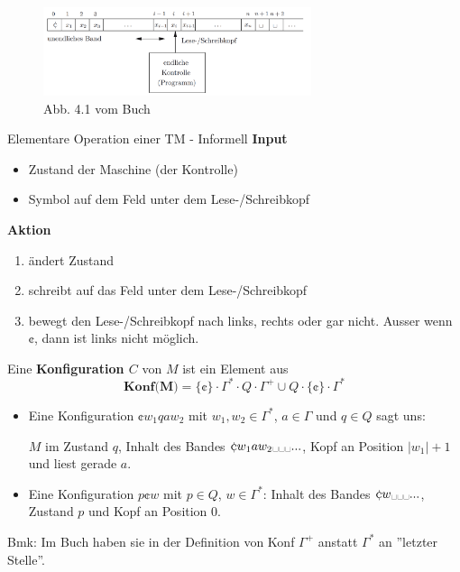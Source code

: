 \documentclass[a4paper, 11pt]{article}
\begin{document}
        \begin{figure}[htp]
            \centering
            \includegraphics[width=0.7\textwidth]{Images/Turingmaschine.png}
            \caption{Abb. 4.1 vom Buch}
        \end{figure}
    
        \begin{mainbox}{Elementare Operation einer TM - Informell}
            \textbf{Input}
            \begin{itemize}[label = -]
                \item Zustand der Maschine (der Kontrolle)
                \item Symbol auf dem Feld unter dem Lese-/Schreibkopf
            \end{itemize}
            \textbf{Aktion}
            \begin{enumerate}[label=(\roman*)]
                \item ändert Zustand
                \item schreibt auf das Feld unter dem Lese-/Schreibkopf
                \item bewegt den Lese-/Schreibkopf nach links, rechts oder gar nicht. Ausser wenn $\cent$, dann ist links nicht möglich.
            \end{enumerate}
        \end{mainbox}
    
        \begin{mainbox}{}
            Eine \textbf{Konfiguration $C$} von $M$ ist ein Element aus 
            $$\textbf{Konf($\mathbf{M}$)} =  \{\cent\} \cdot \Gamma^* \cdot Q \cdot \Gamma^+ \cup Q \cdot \{\cent\} \cdot \Gamma^*$$
        \end{mainbox}
        \begin{itemize}[label=-]
            \item Eine Konfiguration $\cent w_1qaw_2$ mit $w_1, w_2 \in \Gamma^*$, $a \in \Gamma$ und $q \in Q$ sagt uns:
            
            $M$ im Zustand $q$, Inhalt des Bandes $\cent w_1aw_2 \text{\textvisiblespace} \text{\textvisiblespace} \text{\textvisiblespace}...$, Kopf an Position $|w_1|+1$ und liest gerade $a$.
            \item Eine Konfiguration $p\cent w$ mit $p \in Q$, $w\in \Gamma^*$: Inhalt des Bandes $\cent w \text{\textvisiblespace}  \text{\textvisiblespace}  \text{\textvisiblespace}...$, Zustand $p$ und Kopf an Position $0$. 
        \end{itemize}
        Bmk: Im Buch haben sie in der Definition von Konf $\Gamma^+$ anstatt $\Gamma^*$ an ''letzter Stelle''.
    
\end{document}
